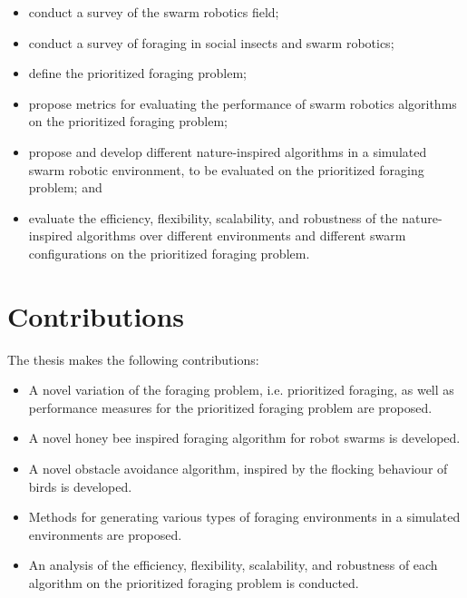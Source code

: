 \begin{itemize}
	\item conduct a survey of the swarm robotics field;
	\item conduct a survey of foraging in social insects and  swarm robotics;
	\item define the prioritized foraging problem;
	\item propose metrics for evaluating the performance of swarm robotics algorithms on the prioritized foraging problem;
	\item propose and develop different nature-inspired algorithms in a simulated swarm robotic environment, to be evaluated on the prioritized foraging problem; and
	\item evaluate the efficiency, flexibility, scalability, and robustness of the nature-inspired algorithms over different environments and different swarm configurations on the prioritized foraging problem.
\end{itemize}



\section{Contributions}
\label{sec:introduction:contributions}

The thesis makes the following contributions:

\begin{itemize}
	\item A novel variation of the foraging problem, i.e. prioritized foraging, as well as performance measures for the prioritized foraging problem are proposed.
	\item A novel honey bee inspired foraging algorithm for robot swarms is developed.
	\item A novel obstacle avoidance algorithm, inspired by the flocking behaviour of birds is developed.
	\item Methods for generating various types of foraging environments in a simulated environments are proposed.
	\item An analysis of the efficiency, flexibility, scalability, and robustness of each algorithm on the prioritized foraging problem is conducted.
\end{itemize}



